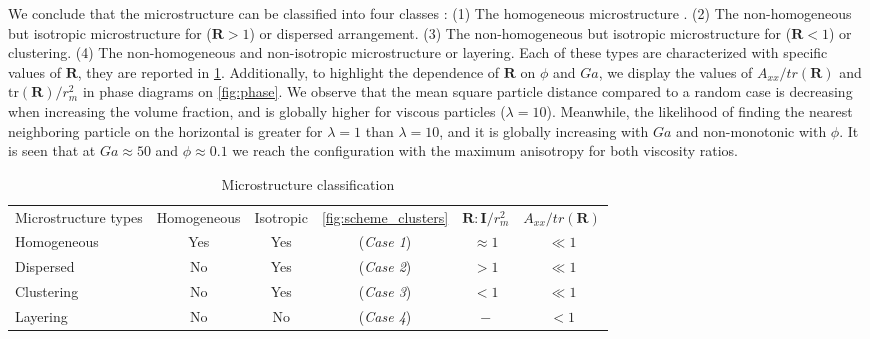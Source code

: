We conclude that the microstructure can be classified into four classes :
(1) The homogeneous microstructure .
(2) The non-homogeneous but isotropic microstructure for ($\textbf{R} > 1$) or dispersed arrangement. %
(3) The non-homogeneous but isotropic microstructure for ($\textbf{R} < 1$) or clustering. 
(4) The non-homogeneous and non-isotropic microstructure or layering. 
Each of these types are characterized with specific values of $\textbf{R}$, they are reported in \ref{tab:microstructure}. 
Additionally, to highlight the dependence of $\textbf{R}$ on $\phi$ and $Ga$, we display the values of $A_{xx}/tr(\textbf{R})$ and $\text{tr}(\textbf{R})/r_m^2$ in phase diagrams on \ref{fig:phase}.
We observe that the mean square particle distance compared to a random case is decreasing when increasing the volume fraction, and is globally higher for viscous particles ($\lambda = 10$).
Meanwhile, the likelihood of finding the nearest neighboring particle on the horizontal is greater for $\lambda=1$ than $\lambda = 10$, and it is globally increasing with  $Ga$ and non-monotonic with $\phi$. 
It is seen that at $Ga \approx 50$ and $\phi \approx 0.1$ we reach the configuration with the maximum anisotropy for both viscosity ratios. 
\begin{table}[h!]
    \caption{Microstructure classification}
    \label{tab:microstructure}
    \centering
    \begin{tabular}{|lccccc|} \hline
        Microstructure types & Homogeneous & Isotropic & \ref{fig:scheme_clusters} & $\textbf{R}:\textbf{I}/r_m^2$ & $A_{xx}/tr(\textbf{R})$ \\
        Homogeneous & Yes & Yes &(\textit{Case 1}) & $ \approx 1$ & $\ll 1$ \\
        Dispersed &  No & Yes  &(\textit{Case 2}) & $ > 1$ & $\ll 1$ \\
        Clustering &  No & Yes  &(\textit{Case 3}) & $ < 1$ & $\ll 1$ \\
        Layering &    No & No  &(\textit{Case 4}) & $ - $ & $< 1$\\ \hline
    \end{tabular}
\end{table}
